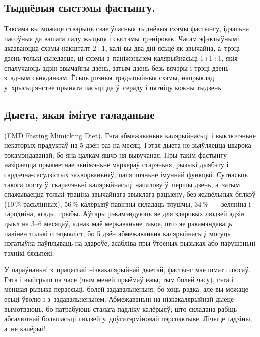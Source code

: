 \subsection{Тыднёвыя сыстэмы фастынгу.}
Таксама вы можаце стварыць свае ўласныя тыднёвыя схэмы фастынгу, ідэальна пасоўныя да вашага ладу жыцьця і сыстэмы трэніровак. Часам эфэктыўнымі аказваюцца схэмы накшталт 2+1, калі вы два дні ясьцё як звычайна, а~трэці дзень толькі сьнедаеце, ці схэмы з~паніжэньнем калярыйнасьці 1+1+1, якія спалучаюць адзін звычайны дзень, затым дзень безь вячэры і трэці дзень з~адным сьняданкам. Ёсьць розныя традыцыйныя схэмы, напрыклад у~хрысьціянстве прынята пасьціцца ў~сераду і пятніцу кожны тыдзень.


\subsection{Дыета, якая імітуе галаданьне} (FMD Fasting Mimicking Diet).
Гэта абмежаваньне калярыйнасьці і выключэньне некаторых прадуктаў на 5 дзён раз на месяц. Гэтая дыета не зьяўляецца шырока рэкамэндаванай, бо яна цалкам яшчэ ня вывучаная. Пры такім фастынгу назіраецца прыкметнае зьніжэньне маркераў старэньня, рызыкі дыябэту і сардэчна-сасудзістых захворваньняў, паляпшэньне імуннай функцыі. Сутнасьць такога посту ў~скарачэньні калярыйнасьці напалову ў~першы дзень, а~затым спажываецца толькі траціна звычайнага звыклага рацыёну, без жывёльных бялкоў (10\,\% расьлінных), 56\,\% калёрыяў павінны складаць тлушчы, 34\,\%~--- зеляніна і гародніна, ягады, грыбы. Аўтары рэкамэндуюць яе для здаровых людзей адзін цыкл на 3--6 месяцаў, аднак маё меркаваньне такое, што яе рэкамэндаваць павінен толькі спэцыяліст, бо 5 дзён абмежаваньня калярыйнасьці могуць нэгатыўна паўплываць на здароўе, асабліва пры ўтоеных рызыках або парушэньні тэхнікі бясьпекі.

У параўнаньні з~працяглай нізкакалярыйнай дыетай, фастынг мае шмат плюсаў. Гэта і выйгрыш па часе (чым меней прыёмаў ежы, тым болей часу), гэта і меншая рызыка пераесьці, болей задавальненьня, бо хоць рэдка, але вы можаце есьці ўволю і з~задавальненьнем. Абмежаваньні на нізкакалярыйнай дыеце вымотваюць, бо патрабуюць сталага падліку калёрыяў, што складана рабіць абсалютнай большасьці людзей у~доўгатэрміновай пэрспэктыве. Лічыце гадзіны, а~не калёрыі!

